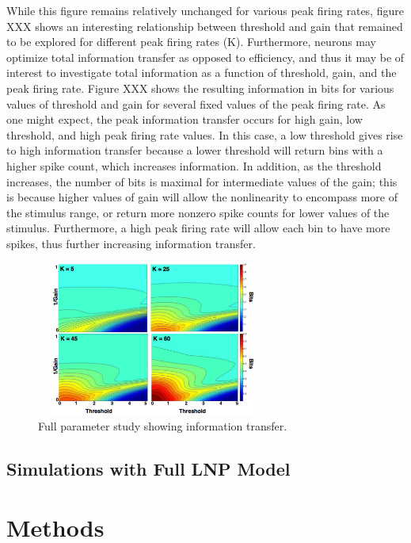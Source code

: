 \documentclass[12pt]{article}
\begin{document}
While this figure remains relatively unchanged for various peak firing rates, figure XXX shows an interesting relationship between threshold and gain that remained to be explored for different peak firing rates (K). Furthermore, neurons may optimize total information transfer as opposed to efficiency, and thus it may be of interest to investigate total information as a function of threshold, gain, and the peak firing rate. Figure XXX shows the resulting information in bits for various values of threshold and gain for several fixed values of the peak firing rate. As one might expect, the peak information transfer occurs for high gain, low threshold, and high peak firing rate values. In this case, a low threshold gives rise to high information transfer because a lower threshold will return bins with a higher spike count, which increases information. In addition, as the threshold increases, the number of bits is maximal for intermediate values of the gain; this is because higher values of gain will allow the nonlinearity to encompass more of the stimulus range, or return more nonzero spike counts for lower values of the stimulus. Furthermore, a high peak firing rate will allow each bin to have more spikes, thus further increasing information transfer. 

\begin{figure}[h!!]
\centerline{\includegraphics*[height = 2.0in,width=3.0in,angle=0]{InfoPeakFR.pdf}}
\label{Figure 4}
\caption{Full parameter study showing information transfer.}
\end{figure}

\subsection{Simulations with Full LNP Model}

\section{Methods}
\end{document}
